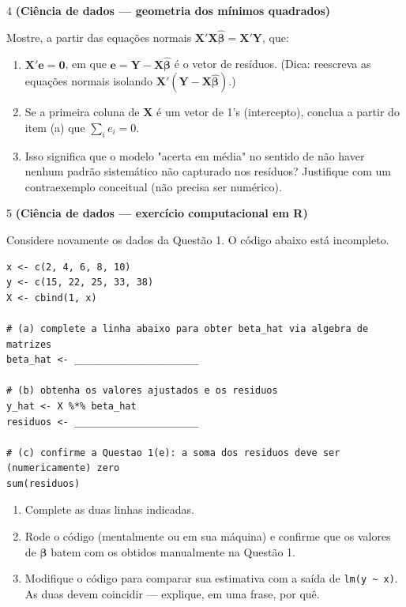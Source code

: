 \documentclass[11pt]{article}
\begin{document}
\begin{questao}{4} \textbf{(Ciência de dados --- geometria dos mínimos quadrados)}

Mostre, a partir das equações normais $\mathbf{X}'\mathbf{X}\hat{\boldsymbol\beta} =
\mathbf{X}'\mathbf{Y}$, que:

\begin{enumerate}[label=(\alph*)]
  \item $\mathbf{X}'\mathbf{e} = \mathbf{0}$, em que $\mathbf{e} = \mathbf{Y} -
    \mathbf{X}\hat{\boldsymbol\beta}$ é o vetor de resíduos. (Dica: reescreva as equações normais
    isolando $\mathbf{X}'(\mathbf{Y} - \mathbf{X}\hat{\boldsymbol\beta})$.)
  \item Se a primeira coluna de $\mathbf{X}$ é um vetor de 1's (intercepto), conclua a partir do
    item (a) que $\sum_i e_i = 0$.
  \item Isso significa que o modelo "acerta em média" no sentido de não haver nenhum padrão
    sistemático não capturado nos resíduos? Justifique com um contraexemplo conceitual (não
    precisa ser numérico).
\end{enumerate}
\end{questao}

\begin{questao}{5} \textbf{(Ciência de dados --- exercício computacional em R)}

Considere novamente os dados da Questão 1. O código abaixo está incompleto.

\begin{lstlisting}
x <- c(2, 4, 6, 8, 10)
y <- c(15, 22, 25, 33, 38)
X <- cbind(1, x)

# (a) complete a linha abaixo para obter beta_hat via algebra de matrizes
beta_hat <- ______________________

# (b) obtenha os valores ajustados e os residuos
y_hat <- X %*% beta_hat
residuos <- ______________________

# (c) confirme a Questao 1(e): a soma dos residuos deve ser (numericamente) zero
sum(residuos)
\end{lstlisting}

\begin{enumerate}[label=(\alph*)]
  \item Complete as duas linhas indicadas.
  \item Rode o código (mentalmente ou em sua máquina) e confirme que os valores de
    $\hat{\boldsymbol\beta}$ batem com os obtidos manualmente na Questão 1.
  \item Modifique o código para comparar sua estimativa com a saída de \texttt{lm(y \textasciitilde{}
    x)}. As duas devem coincidir --- explique, em uma frase, por quê.
\end{enumerate}
\end{questao}
\end{document}
